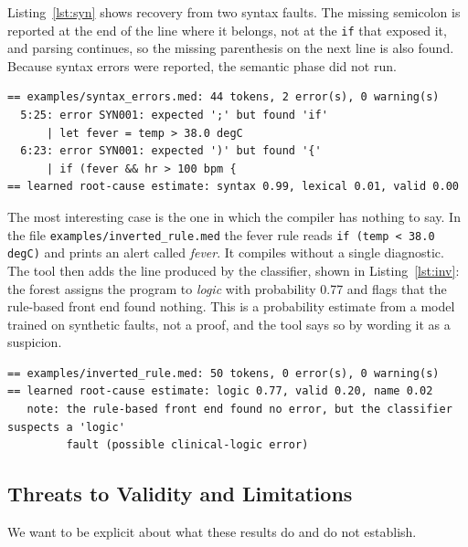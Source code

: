 \documentclass[conference]{IEEEtran}
\newcommand{\code}[1]{\texttt{#1}}
\begin{document}
Listing~\ref{lst:syn} shows recovery from two syntax faults. The missing semicolon is reported at the end of the line
where it belongs, not at the \code{if} that exposed it, and parsing continues, so the missing parenthesis on the next line is also
found. Because syntax errors were reported, the semantic phase did not run.

\begin{lstlisting}[language={},numbers=none,caption={Output of \texttt{medcheck.py examples/syntax\_errors.med}.},label={lst:syn}]
== examples/syntax_errors.med: 44 tokens, 2 error(s), 0 warning(s)
  5:25: error SYN001: expected ';' but found 'if'
      | let fever = temp > 38.0 degC
  6:23: error SYN001: expected ')' but found '{'
      | if (fever && hr > 100 bpm {
== learned root-cause estimate: syntax 0.99, lexical 0.01, valid 0.00
\end{lstlisting}

The most interesting case is the one in which the compiler has nothing to say. In the file
\texttt{examples/\allowbreak inverted\_\allowbreak rule.med} the fever rule reads \code{if (temp < 38.0 degC)} and prints an alert called \emph{fever}. It compiles without a single
diagnostic. The tool then adds the line produced by the classifier, shown in Listing~\ref{lst:inv}: the forest assigns the program
to \emph{logic} with probability 0.77 and flags that the rule-based front end found nothing. This is a probability estimate from
a model trained on synthetic faults, not a proof, and the tool says so by wording it as a suspicion.

\begin{lstlisting}[language={},numbers=none,caption={Output of \texttt{medcheck.py examples/inverted\_rule.med}.},label={lst:inv}]
== examples/inverted_rule.med: 50 tokens, 0 error(s), 0 warning(s)
== learned root-cause estimate: logic 0.77, valid 0.20, name 0.02
   note: the rule-based front end found no error, but the classifier suspects a 'logic'
         fault (possible clinical-logic error)
\end{lstlisting}

\subsection{Threats to Validity and Limitations}\label{sec:threats}

We want to be explicit about what these results do and do not establish.
\end{document}

